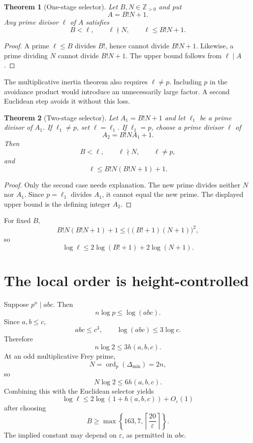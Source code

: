 \documentclass[11pt]{article}
\newtheorem{theorem}{Theorem}[section]
\newcommand{\Z}{\mathbb Z}
\newcommand{\ord}{\operatorname{ord}}
\begin{document}
\begin{theorem}[One-stage selector]
Let $B,N\in\Z_{>0}$ and put
\[
 A=B!N+1.
\]
Any prime divisor $\ell$ of $A$ satisfies
\[
 B<\ell,\qquad \ell\nmid N,\qquad \ell\le B!N+1.
\]
\end{theorem}

\begin{proof}
A prime $\ell\le B$ divides $B!$, hence cannot divide $B!N+1$.
Likewise, a prime dividing $N$ cannot divide $B!N+1$.  The upper bound follows
from $\ell\mid A$.
\end{proof}

The multiplicative inertia theorem also requires $\ell\ne p$.  Including $p$
in the avoidance product would introduce an unnecessarily large factor.  A
second Euclidean step avoids it without this loss.

\begin{theorem}[Two-stage selector]
Let $A_1=B!N+1$ and let $\ell_1$ be a prime divisor of $A_1$.  If
$\ell_1\ne p$, set $\ell=\ell_1$.  If $\ell_1=p$, choose a prime divisor
$\ell$ of
\[
 A_2=B!NA_1+1.
\]
Then
\[
 B<\ell,\qquad \ell\nmid N,
 \qquad \ell\ne p,
\]
and
\[
 \ell\le B!N(B!N+1)+1.
\]
\end{theorem}

\begin{proof}
Only the second case needs explanation.  The new prime divides neither $N$
nor $A_1$.  Since $p=\ell_1$ divides $A_1$, it cannot equal the new prime.
The displayed upper bound is the defining integer $A_2$.
\end{proof}

For fixed $B$,
\[
 B!N(B!N+1)+1
 \le \bigl((B!+1)(N+1)\bigr)^2,
\]
so
\[
 \log\ell\le
 2\log(B!+1)+2\log(N+1).
\]

\section{The local order is height-controlled}

Suppose $p^n\mid abc$.  Then
\[
 n\log p\le\log(abc).
\]
Since $a,b\le c$,
\[
 abc\le c^3,
 \qquad \log(abc)\le3\log c.
\]
Therefore
\[
 n\log2\le3h(a,b,c).
\]
At an odd multiplicative Frey prime,
\[
 N=\ord_p(\Delta_{\min})=2n,
\]
so
\[
 N\log2\le6h(a,b,c).
\]
Combining this with the Euclidean selector yields
\[
 \log\ell\le 2\log(1+h(a,b,c))+O_{\varepsilon}(1)
\]
after choosing
\[
 B\ge\max\left\{163,7,\left\lceil\frac{20}{\varepsilon}\right\rceil\right\}.
\]
The implied constant may depend on $\varepsilon$, as permitted in $abc$.
\end{document}
